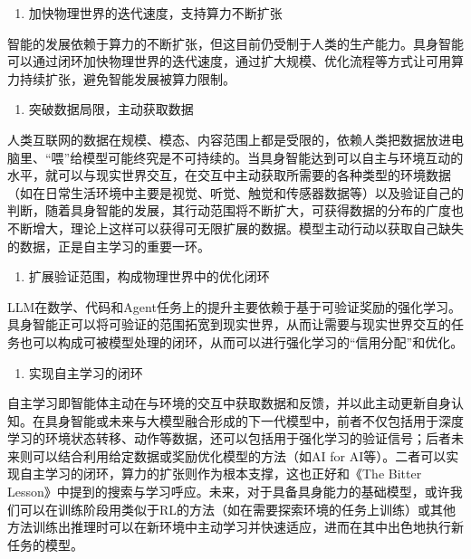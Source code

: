\begin{enumerate}
\def\labelenumi{\arabic{enumi}.}
\tightlist
\item
  加快物理世界的迭代速度，支持算力不断扩张
\end{enumerate}

智能的发展依赖于算力的不断扩张，但这目前仍受制于人类的生产能力。具身智能可以通过闭环加快物理世界的迭代速度，通过扩大规模、优化流程等方式让可用算力持续扩张，避免智能发展被算力限制。

\begin{enumerate}
\def\labelenumi{\arabic{enumi}.}
\setcounter{enumi}{1}
\tightlist
\item
  突破数据局限，主动获取数据
\end{enumerate}

人类互联网的数据在规模、模态、内容范围上都是受限的，依赖人类把数据放进电脑里、``喂''给模型可能终究是不可持续的。当具身智能达到可以自主与环境互动的水平，就可以与现实世界交互，在交互中主动获取所需要的各种类型的环境数据（如在日常生活环境中主要是视觉、听觉、触觉和传感器数据等）以及验证自己的判断，随着具身智能的发展，其行动范围将不断扩大，可获得数据的分布的广度也不断增大，理论上这样可以获得可无限扩展的数据。模型主动行动以获取自己缺失的数据，正是自主学习的重要一环。

\begin{enumerate}
\def\labelenumi{\arabic{enumi}.}
\setcounter{enumi}{2}
\tightlist
\item
  扩展验证范围，构成物理世界中的优化闭环
\end{enumerate}

LLM在数学、代码和Agent任务上的提升主要依赖于基于可验证奖励的强化学习。具身智能正可以将可验证的范围拓宽到现实世界，从而让需要与现实世界交互的任务也可以构成可被模型处理的闭环，从而可以进行强化学习的``信用分配''和优化。

\begin{enumerate}
\def\labelenumi{\arabic{enumi}.}
\setcounter{enumi}{3}
\tightlist
\item
  实现自主学习的闭环
\end{enumerate}

自主学习即智能体主动在与环境的交互中获取数据和反馈，并以此主动更新自身认知。在具身智能或未来与大模型融合形成的下一代模型中，前者不仅包括用于深度学习的环境状态转移、动作等数据，还可以包括用于强化学习的验证信号；后者未来则可以结合利用给定数据或奖励优化模型的方法（如AI for AI等）。二者可以实现自主学习的闭环，算力的扩张则作为根本支撑，这也正好和《The Bitter Lesson》中提到的搜索与学习呼应。未来，对于具备具身能力的基础模型，或许我们可以在训练阶段用类似于RL的方法（如在需要探索环境的任务上训练）或其他方法训练出推理时可以在新环境中主动学习并快速适应，进而在其中出色地执行新任务的模型。

